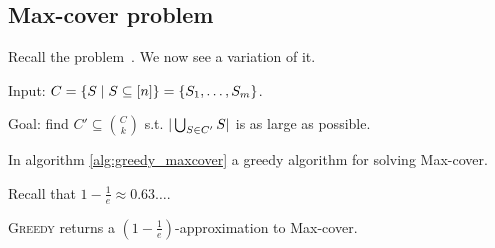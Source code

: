 \subsection{Max-cover problem}

    Recall the problem~.
    We now see a variation of it.

    Input: $C = \{ S \; \vert \; S \subseteq [n] \} = \{ S_1, \dots, S_m \}$.

    Goal: find $C' \subseteq \binom{C}{k}$ s.t. $\vert \bigcup_{S \in C'} S \vert$ is as large as possible.

    In algorithm \ref{alg:greedy_maxcover} a greedy algorithm for solving Max-cover.

    

    Recall that $1 - \frac{1}{e} \approx 0.63\dots$.

    \begin{theorem}
        \textsc{Greedy} returns a $(1 - \frac{1}{e})$-approximation to Max-cover.
    \end{theorem}

